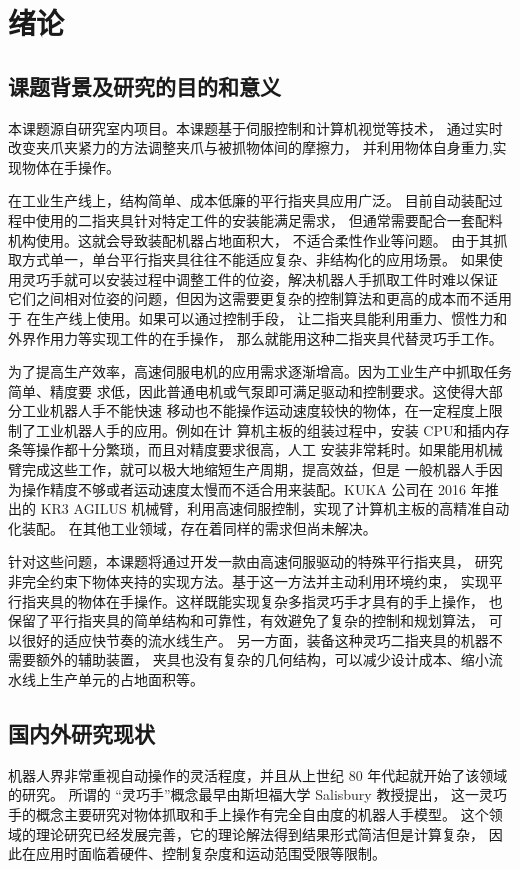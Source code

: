 \chapter{绪论}

\section{课题背景及研究的目的和意义}
本课题源自研究室内项目。本课题基于伺服控制和计算机视觉等技术，
通过实时改变夹爪夹紧力的方法调整夹爪与被抓物体间的摩擦力，
并利用物体自身重力,实现物体在手操作。

在工业生产线上，结构简单、成本低廉的平行指夹具应用广泛。
目前自动装配过程中使用的二指夹具针对特定工件的安装能满足需求，
但通常需要配合一套配料机构使用。这就会导致装配机器占地面积大，
不适合柔性作业等问题。
由于其抓取方式单一，单台平行指夹具往往不能适应复杂、非结构化的应用场景。
如果使用灵巧手就可以安装过程中调整工件的位姿，解决机器人手抓取工件时难以保证
它们之间相对位姿的问题，但因为这需要更复杂的控制算法和更高的成本而不适用于
在生产线上使用。如果可以通过控制手段，
让二指夹具能利用重力、惯性力和外界作用力等实现工件的在手操作，
那么就能用这种二指夹具代替灵巧手工作。

为了提高生产效率，高速伺服电机的应用需求逐渐增高。因为工业生产中抓取任务简单、精度要
求低，因此普通电机或气泵即可满足驱动和控制要求。这使得大部分工业机器人手不能快速
移动也不能操作运动速度较快的物体，在一定程度上限制了工业机器人手的应用。例如在计
算机主板的组装过程中，安装 CPU和插内存条等操作都十分繁琐，而且对精度要求很高，人工
安装非常耗时。如果能用机械臂完成这些工作，就可以极大地缩短生产周期，提高效益，但是
一般机器人手因为操作精度不够或者运动速度太慢而不适合用来装配。KUKA 公司在 2016
年推出的 KR3 AGILUS 机械臂，利用高速伺服控制，实现了计算机主板的高精准自动化装配。
在其他工业领域，存在着同样的需求但尚未解决。

针对这些问题，本课题将通过开发一款由高速伺服驱动的特殊平行指夹具，
研究非完全约束下物体夹持的实现方法。基于这一方法并主动利用环境约束，
实现平行指夹具的物体在手操作。这样既能实现复杂多指灵巧手才具有的手上操作，
也保留了平行指夹具的简单结构和可靠性，有效避免了复杂的控制和规划算法，
可以很好的适应快节奏的流水线生产。
另一方面，装备这种灵巧二指夹具的机器不需要额外的辅助装置，
夹具也没有复杂的几何结构，可以减少设计成本、缩小流水线上生产单元的占地面积等。

\section{国内外研究现状}
机器人界非常重视自动操作的灵活程度，并且从上世纪 80 年代起就开始了该领域的研究。
所谓的 “灵巧手”概念最早由斯坦福大学 Salisbury 教授提出，
这一灵巧手的概念主要研究对物体抓取和手上操作有完全自由度的机器人手模型。
这个领域的理论研究已经发展完善，它的理论解法得到结果形式简洁但是计算复杂，
因此在应用时面临着硬件、控制复杂度和运动范围受限等限制\cite{ref1}。

